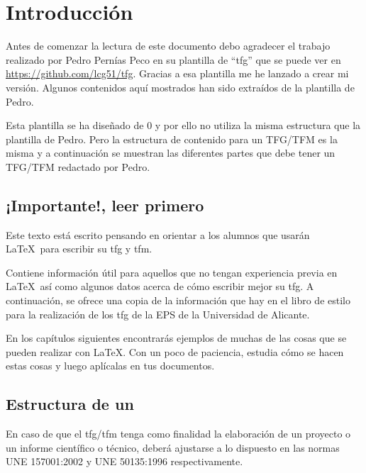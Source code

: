 
\chapter{Introducción}

Antes de comenzar la lectura de este documento debo agradecer el trabajo realizado por Pedro Pernías Peco en su plantilla de ``tfg'' que se puede ver en \url{https://github.com/lcg51/tfg}. Gracias a esa plantilla me he lanzado a crear mi versión. Algunos contenidos aquí mostrados han sido extraídos de la plantilla de Pedro. 
\\
\par Esta plantilla se ha diseñado de 0 y por ello no utiliza la misma estructura que la plantilla de Pedro. Pero la estructura de contenido para un TFG/TFM es la misma y a continuación se muestran las diferentes partes que debe tener un TFG/TFM redactado por Pedro.
\section{¡Importante!, leer primero}

Este texto está escrito pensando en orientar a los alumnos que usarán \LaTeX~para escribir su \gls{tfg} y \gls{tfm}. 
\\
\par Contiene información útil para aquellos que no tengan experiencia previa en \LaTeX~así como algunos datos acerca de cómo escribir mejor su \gls{tfg}.
A continuación, se ofrece una copia de la información que hay en el libro de estilo para la realización de los \gls{tfg} de la EPS de la Universidad de Alicante.

En los capítulos siguientes encontrarás ejemplos de muchas de las cosas que se pueden realizar con \LaTeX. Con un poco de paciencia, estudia cómo se hacen estas cosas y luego aplícalas en tus documentos.


\section{Estructura de un }

En caso de que el \gls{tfg}/\gls{tfm} tenga como finalidad la elaboración de un proyecto o un 
informe científico o técnico, deberá ajustarse a lo dispuesto en las normas UNE 
157001:2002 y UNE 50135:1996 respectivamente.

